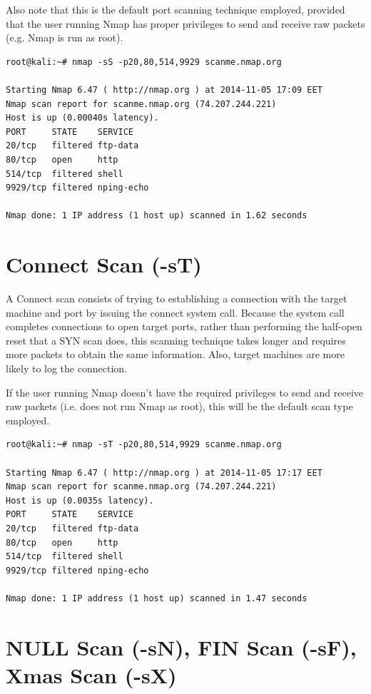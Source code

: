 \documentclass[a4paper,oneside,12pt]{book}
\begin{document}
Also note that this is the default port scanning technique employed, provided that the user running Nmap has proper privileges to send and receive raw packets (e.g. Nmap is run as root).

\begin{lstlisting}[title=A sample Nmap scan using the SYN Scan option]
root@kali:~# nmap -sS -p20,80,514,9929 scanme.nmap.org

Starting Nmap 6.47 ( http://nmap.org ) at 2014-11-05 17:09 EET
Nmap scan report for scanme.nmap.org (74.207.244.221)
Host is up (0.00040s latency).
PORT     STATE    SERVICE
20/tcp   filtered ftp-data
80/tcp   open     http
514/tcp  filtered shell
9929/tcp filtered nping-echo

Nmap done: 1 IP address (1 host up) scanned in 1.62 seconds
\end{lstlisting}


\section{Connect Scan (-sT)}

A Connect scan consists of trying to establishing a connection with the target machine and port by issuing the connect system call. Because the system call completes connections to open target ports, rather than performing the half-open reset that a SYN scan does, this scanning technique takes longer and requires more packets to obtain the same information. Also, target machines are more likely to log the connection.

If the user running Nmap doesn't have the required privileges to send and receive raw packets (i.e. does not run Nmap as root), this will be the default scan type employed.

\begin{lstlisting}[title=A sample Nmap scan using the Connect Scan option]
root@kali:~# nmap -sT -p20,80,514,9929 scanme.nmap.org

Starting Nmap 6.47 ( http://nmap.org ) at 2014-11-05 17:17 EET
Nmap scan report for scanme.nmap.org (74.207.244.221)
Host is up (0.0035s latency).
PORT     STATE    SERVICE
20/tcp   filtered ftp-data
80/tcp   open     http
514/tcp  filtered shell
9929/tcp filtered nping-echo

Nmap done: 1 IP address (1 host up) scanned in 1.47 seconds
\end{lstlisting}

\section{NULL Scan (-sN), FIN Scan (-sF), Xmas Scan (-sX)}
\end{document}
